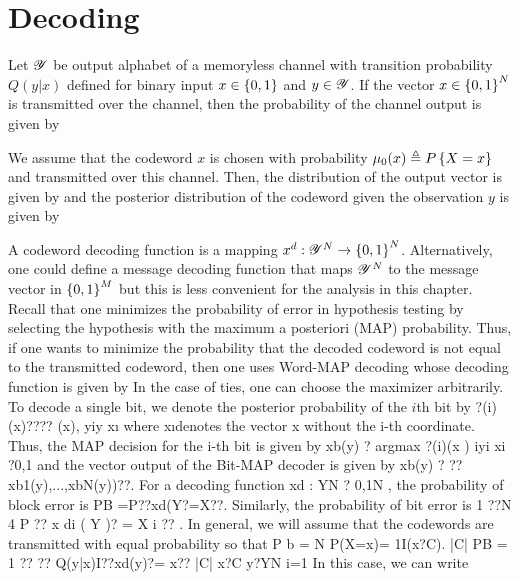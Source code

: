 \documentclass[letterpaper,english,10pt]{article}
\begin{document}
\section{Decoding}
Let $\mathscr{Y}$ be output alphabet of a memoryless channel with transition probability $Q(y|x)$ defined for binary input $x \in \left\{0,1\right\}$ and $y \in  \mathscr{Y}$. 
If the vector $x \in \left\{0,1\right\}^N$ is transmitted over the channel, 
then the probability of the channel output is given by 

We assume that the codeword $x$ is chosen with probability $\mu_0(x) \triangleq P\left\{X = x\right\}$ 
and transmitted over this channel. 
Then, the distribution of the output vector is given by 
and the posterior distribution of the codeword given the observation $y$ is given by 

A codeword decoding function is a mapping $x^d : \mathscr{Y}^N \to \left\{0,1\right\}^N$. 
Alternatively, one could define a message decoding function that maps 
$\mathscr{Y}^N$ to the message vector in $\left\{0,1\right\}^M$ but this is less convenient for the analysis in this chapter. Recall that one minimizes the probability of error in hypothesis testing by selecting the hypothesis with the maximum a posteriori (MAP) probability. 
Thus, if one wants to minimize the probability that the decoded codeword is not equal to the transmitted codeword, then one uses Word-MAP decoding whose decoding function is given by 
In the case of ties, one can choose the maximizer arbitrarily.
To decode a single bit, we denote the posterior probability of the $i$th bit by
?(i)(x)???? (x), yiy
x\i
where x\i denotes the vector x without the i-th coordinate. Thus, the MAP decision for the
i-th bit is given by
xb(y) ? argmax ?(i)(x ) iyi
xi ?{0,1}
and the vector output of the Bit-MAP decoder is given by
xb(y) ? ??xb1(y),...,xbN(y))??.
For a decoding function xd : YN ? {0,1}N , the probability of block error is
PB =P??xd(Y?=X??. Similarly, the probability of bit error is
1 ??N
4
                   P ?? x di ( Y )? = X i ?? .
In general, we will assume that the codewords are transmitted with equal probability so that
P b = N
P(X=x)= 1I(x?C).
|C|
PB = 1 ?? ?? Q(y|x)I??xd(y)?= x?? |C| x?C y?YN
  i=1
    In this case, we can write
        
\end{document}

